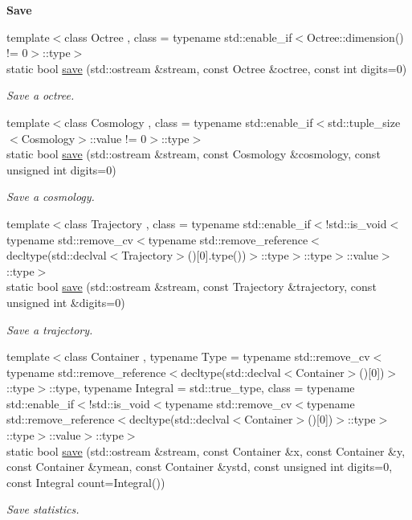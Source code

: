 \begin{Indent}{\bf Save}\par
\begin{DoxyCompactItemize}
\item 
{\footnotesize template$<$class Octree , class  = typename std\-::enable\-\_\-if$<$\-Octree\-::dimension() != 0$>$\-::type$>$ }\\static bool \hyperlink{exceptionOutput_af1e22abb9de803b477dbae6f79e6b379}{save} (std\-::ostream \&stream, const Octree \&octree, const int digits=0)
\begin{DoxyCompactList}\small\item\em Save a octree. \end{DoxyCompactList}\item 
{\footnotesize template$<$class Cosmology , class  = typename std\-::enable\-\_\-if$<$std\-::tuple\-\_\-size$<$\-Cosmology$>$\-::value != 0$>$\-::type$>$ }\\static bool \hyperlink{exceptionOutput_a8ef3075f905bf4672ec76a57f94b245d}{save} (std\-::ostream \&stream, const Cosmology \&cosmology, const unsigned int digits=0)
\begin{DoxyCompactList}\small\item\em Save a cosmology. \end{DoxyCompactList}\item 
{\footnotesize template$<$class Trajectory , class  = typename std\-::enable\-\_\-if$<$!std\-::is\-\_\-void$<$typename std\-::remove\-\_\-cv$<$typename std\-::remove\-\_\-reference$<$decltype(std\-::declval$<$\-Trajectory$>$()\mbox{[}0\mbox{]}.\-type())$>$\-::type$>$\-::type$>$\-::value$>$\-::type$>$ }\\static bool \hyperlink{exceptionOutput_a31718f382ea48cc4d7ea4ed360043163}{save} (std\-::ostream \&stream, const Trajectory \&trajectory, const unsigned int \&digits=0)
\begin{DoxyCompactList}\small\item\em Save a trajectory. \end{DoxyCompactList}\item 
{\footnotesize template$<$class Container , typename Type  = typename std\-::remove\-\_\-cv$<$typename std\-::remove\-\_\-reference$<$decltype(std\-::declval$<$\-Container$>$()\mbox{[}0\mbox{]})$>$\-::type$>$\-::type, typename Integral  = std\-::true\-\_\-type, class  = typename std\-::enable\-\_\-if$<$!std\-::is\-\_\-void$<$typename std\-::remove\-\_\-cv$<$typename std\-::remove\-\_\-reference$<$decltype(std\-::declval$<$\-Container$>$()\mbox{[}0\mbox{]})$>$\-::type$>$\-::type$>$\-::value$>$\-::type$>$ }\\static bool \hyperlink{exceptionOutput_a3600c5073abbe3899151cefd9e60ee1a}{save} (std\-::ostream \&stream, const Container \&x, const Container \&y, const Container \&ymean, const Container \&ystd, const unsigned int digits=0, const Integral count=Integral())
\begin{DoxyCompactList}\small\item\em Save statistics. \end{DoxyCompactList}\end{DoxyCompactItemize}
\end{Indent}
